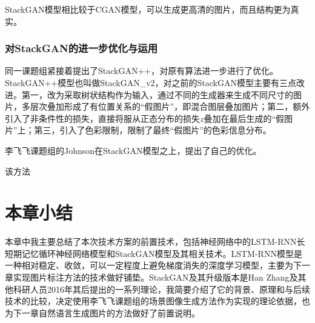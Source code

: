   StackGAN模型相比较于CGAN模型，可以生成更高清的图片，而且结构更为真实。

\subsubsection{对StackGAN的进一步优化与运用}
同一课题组紧接着提出了StackGAN++，对原有算法进一步进行了优化。StackGAN++模型也叫做StackGAN\_v2，对之前的StackGAN模型主要有三点改进。第一，改为采取树状结构作为输入，通过不同的生成器来生成不同尺寸的图片，多层次叠加形成了有位置关系的“假图片”，即混合图层叠加图片；第二，额外引入了非条件性的损失，直接将服从正态分布的损失$z$叠加在最后生成的“假图片”上；第三，引入了色彩限制，限制了最终“假图片”的色彩信息分布。

李飞飞课题组的Johnson在StackGAN模型之上，提出了自己的优化。

该方法

\section{本章小结}
本章中我主要总结了本次技术方案的前置技术，包括神经网络中的LSTM-RNN长短期记忆循环神经网络模型和StackGAN模型及其相关技术。LSTM-RNN模型是一种相对稳定、收敛，可以一定程度上避免梯度消失的深度学习模型，主要为下一章实现图片标注方法的技术做好铺垫。StackGAN及其升级版本是Han Zhang及其他科研人员2016年其后提出的一系列理论，我简要介绍了它的背景、原理和与后续技术的比较，决定使用李飞飞课题组的场景图像生成方法作为实现的理论依据，也为下一章自然语言生成图片的方法做好了前置说明。